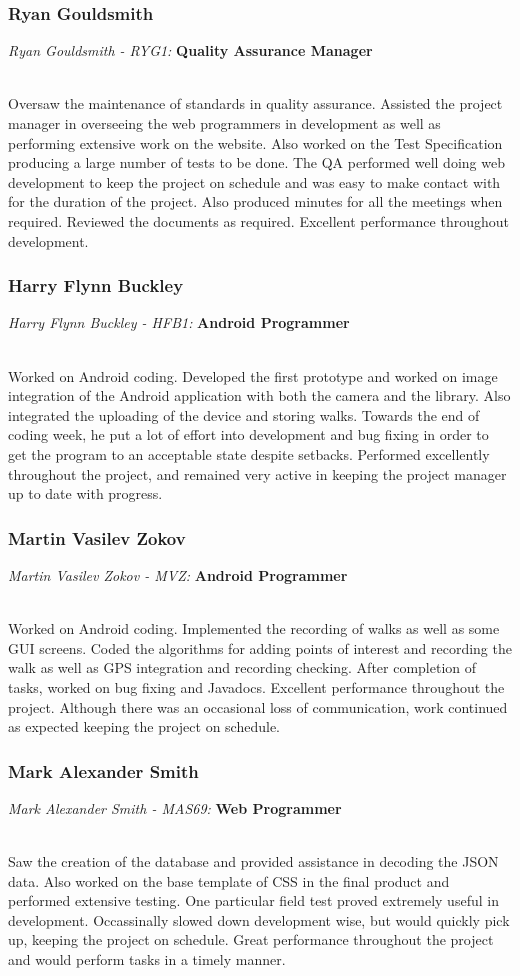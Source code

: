 \documentclass[12pt]{article}
\begin{document}
\subsubsection{Ryan Gouldsmith}
\centerline{\emph{Ryan Gouldsmith - RYG1:}\textbf{ Quality Assurance Manager}}
~\\
Oversaw the maintenance of standards in quality assurance. Assisted the project manager in overseeing the web programmers in development as well as performing extensive work on the website. Also worked on the Test Specification producing a large number of tests to be done. The QA performed well doing web development to keep the project on schedule and was easy to make contact with for the duration of the project. Also produced minutes for all the meetings when required. Reviewed the documents as required. Excellent performance throughout development.

\subsubsection{Harry Flynn Buckley}
\centerline{\emph{Harry Flynn Buckley - HFB1:}\textbf{ Android Programmer}}
~\\
Worked on Android coding. Developed the first prototype and worked on image integration of the Android application with both the camera and the library. Also integrated the uploading of the device and storing walks. Towards the end of coding week, he put a lot of effort into development and bug fixing in order to get the program to an acceptable state despite setbacks. Performed excellently throughout the project, and remained very active in keeping the project manager up to date with progress.

\subsubsection{Martin Vasilev Zokov }
\centerline{\emph{Martin Vasilev Zokov - MVZ:}\textbf{ Android Programmer}}
~\\
Worked on Android coding. Implemented the recording of walks as well as some GUI screens. Coded the algorithms for adding points of interest and recording the walk as well as GPS integration and recording checking. After completion of tasks, worked on bug fixing and Javadocs. Excellent performance throughout the project. Although there was an occasional loss of communication, work continued as expected keeping the project on schedule.

\subsubsection{Mark Alexander Smith}
\centerline{\emph{Mark Alexander Smith - MAS69:}\textbf{ Web Programmer}}
~\\
Saw the creation of the database and provided assistance in decoding the JSON data. Also worked on the base template of CSS in the final product and performed extensive testing. One particular field test proved extremely useful in development. Occassinally slowed down development wise, but would quickly pick up, keeping the project on schedule. Great performance throughout the project and would perform tasks in a timely manner.
\end{document}
